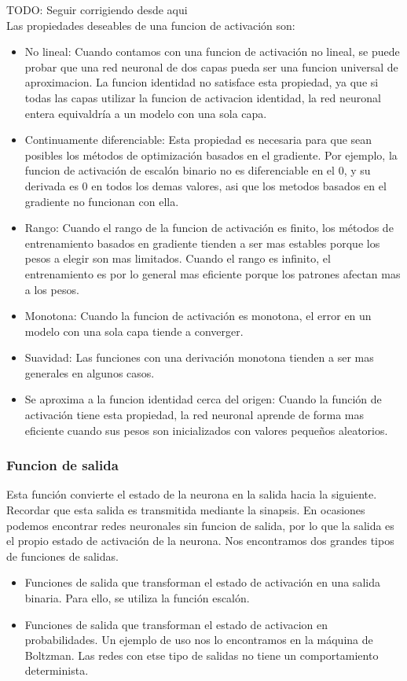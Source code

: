 TODO: Seguir corrigiendo desde aqui\\
Las propiedades deseables de una funcion de activación son:
\begin{itemize}
\item No lineal: Cuando contamos con una funcion de activación no lineal, se puede probar que una red neuronal de dos capas pueda ser una funcion universal de aproximacion. La funcion identidad no satisface esta propiedad, ya que si todas las capas utilizar la funcion de activacion identidad, la red neuronal entera equivaldría a un modelo con una sola capa.
\item Continuamente diferenciable: Esta propiedad es necesaria para que sean posibles los métodos de optimización basados en el gradiente. Por ejemplo, la funcion de activación de escalón binario no es diferenciable en el 0, y su derivada es 0 en todos los demas valores, asi que los metodos basados en el gradiente no funcionan con ella.
\item Rango: Cuando el rango de la funcion de activación es finito, los métodos de entrenamiento basados en gradiente tienden a ser mas estables porque los pesos a elegir son mas limitados. Cuando el rango es infinito, el entrenamiento es por lo general mas eficiente porque los patrones afectan mas a los pesos.
\item Monotona: Cuando la funcion de activación es monotona, el error en un modelo con una sola capa tiende a converger.
\item Suavidad: Las funciones con una derivación monotona tienden a ser mas generales en algunos casos.
\item Se aproxima a la funcion identidad cerca del origen: Cuando la función de activación tiene esta propiedad, la red neuronal aprende de forma mas eficiente cuando sus pesos son inicializados con valores pequeños aleatorios.
\end{itemize}

\subsubsection {Funcion de salida}
Esta función convierte el estado de la neurona en la salida hacia la siguiente. Recordar que esta salida es transmitida mediante la sinapsis. En ocasiones podemos encontrar redes neuronales sin funcion de salida, por lo que la salida es el propio estado de activación de la neurona. Nos encontramos dos grandes tipos de funciones de salidas.
\begin{itemize}
\item Funciones de salida que transforman el estado de activación en una salida binaria. Para ello, se utiliza la función escalón.
\item Funciones de salida que transforman el estado de activacion en probabilidades. Un ejemplo de uso nos lo encontramos en la máquina de Boltzman. Las redes con etse tipo de salidas no tiene un comportamiento determinista.
\end{itemize}


